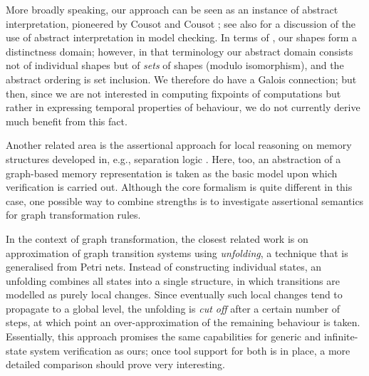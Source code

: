 More broadly speaking, our approach can be seen as an instance of abstract
interpretation, pioneered by Cousot and Cousot \cite{CouCou79}; see also
\cite{CouCou99} for a discussion of the use of abstract interpretation in model
checking. In terms of \cite{PolChaCor01}, our shapes form a distinctness
domain; however, in that terminology our abstract domain consists not of
individual shapes but of \emph{sets} of shapes (modulo isomorphism), and the
abstract ordering is set inclusion. We therefore do have a Galois connection;
but then, since we are not interested in computing fixpoints of computations
but rather in expressing temporal properties of behaviour, we do not currently
derive much benefit from this fact.

Another related area is the assertional approach for local reasoning on memory
structures developed in, e.g., separation logic \cite{OHeReyYan01,Reyn02}.
Here, too, an abstraction of a graph-based memory representation is taken as
the basic model upon which verification is carried out. Although the core
formalism is quite different in this case, one possible way to combine
strengths is to investigate assertional semantics for graph transformation
rules.

In the context of graph transformation, the closest related work is
\cite{BalKoeKoe03} on approximation of graph transition systems using
\emph{unfolding}, a technique that is generalised from Petri nets. Instead of
constructing individual states, an unfolding combines all states into a single
structure, in which transitions are modelled as purely local changes. Since
eventually such local changes tend to propagate to a global level, the
unfolding is \emph{cut off} after a certain number of steps, at which point an
over-approximation of the remaining behaviour is taken. Essentially, this
approach promises the same capabilities for generic and infinite-state system
verification as ours; once tool support for both is in place, a more detailed
comparison should prove very interesting.

